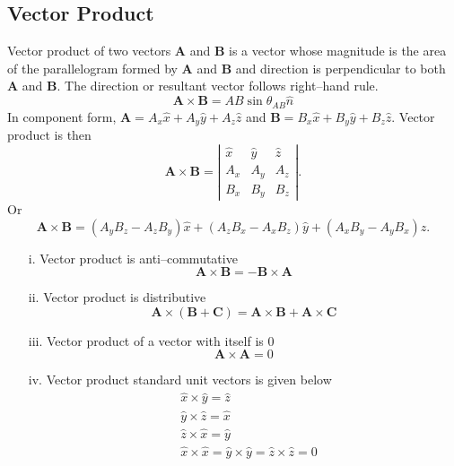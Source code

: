 \documentclass[12pt,a4paper]{article}
\begin{document}
\subsection{Vector Product}
Vector product of two vectors \textbf{A} and \textbf{B} is a vector whose magnitude is the area of the parallelogram formed by \textbf{A} and \textbf{B} and direction is perpendicular to both \textbf{A} and \textbf{B}. The direction or resultant vector follows right--hand rule.
\begin{equation}
\textbf{A}\times \textbf{B}=AB\sin\theta_{AB}\hat n
\end{equation}
In component form, $\textbf{A}=A_x\hat x+A_y\hat y+A_z\hat z$ and $\textbf{B}=B_x\hat x+B_y\hat y+B_z\hat z$. Vector product is then
\begin{equation}
\textbf{A}\times \textbf{B}=\left| \begin{array}{ccc} \hat{x} & \hat{y} & \hat{z} \\ A_x & A_y & A_z\\ B_x & B_y & B_z \end{array} \right|.
\end{equation}
Or
\begin{equation}
\textbf{A}\times \textbf{B}=(A_yB_z-A_zB_y)\hat x+(A_zB_x-A_xB_z)\hat y+(A_xB_y-A_yB_x)\hat z.
\end{equation}
\begin{itemize}
\item[i.] Vector product is anti--commutative
\begin{equation*}
\textbf{A}\times \textbf{B}=-\textbf{B}\times \textbf{A}
\end{equation*}
\item[ii.] Vector product is distributive
\begin{equation*}
\textbf{A}\times (\textbf{B}+\textbf{C})=\textbf{A}\times \textbf{B}+\textbf{A}\times \textbf{C}
\end{equation*}
\item[iii.] Vector product of a vector with itself is 0
\begin{equation*}
\textbf{A}\times \textbf{A}=0
\end{equation*}
\item[iv.] Vector product standard unit vectors is given below
\begin{equation*}
\begin{split}
&\hat x\times\hat y=\hat z\\
&\hat y\times\hat z=\hat x\\
&\hat z\times\hat x=\hat y\\
&\hat x\times\hat x=\hat y\times\hat y=\hat z\times\hat z=0
\end{split}
\end{equation*}
\end{itemize}
\end{document}
